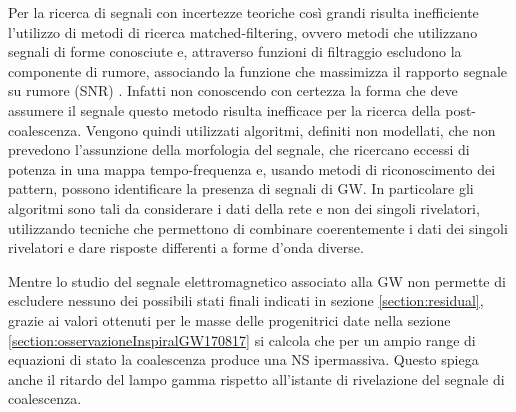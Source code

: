 Per la ricerca di segnali con incertezze teoriche così grandi risulta inefficiente l'utilizzo di metodi di ricerca matched-filtering, ovvero metodi che utilizzano segnali di forme conosciute e, attraverso funzioni di filtraggio escludono la componente di rumore, associando la funzione che massimizza il rapporto segnale su rumore (SNR)	\cite{maggiore2008gravitational}. Infatti non conoscendo con certezza la forma che deve assumere il segnale questo metodo risulta inefficace per la ricerca della post-coalescenza. Vengono quindi utilizzati algoritmi, definiti non modellati, che non prevedono l'assunzione della morfologia del segnale, che ricercano eccessi di potenza in una mappa tempo-frequenza e, usando metodi di riconoscimento dei pattern, possono identificare la presenza di segnali di GW. In particolare gli algoritmi sono tali da considerare i dati della rete e non dei singoli rivelatori, utilizzando tecniche che permettono di combinare coerentemente i dati dei singoli rivelatori e dare risposte differenti a forme d'onda diverse.

Mentre lo studio del segnale elettromagnetico associato alla GW non permette di escludere nessuno dei possibili stati finali indicati in sezione \ref{section:residual}, grazie ai valori ottenuti per le masse delle progenitrici date nella sezione \ref{section:osservazioneInspiralGW170817} si calcola che per un ampio range di equazioni di stato la coalescenza produce una NS ipermassiva. Questo spiega anche il ritardo del lampo gamma rispetto all'istante di rivelazione del segnale di coalescenza\cite{sarin2020evolution}. 

